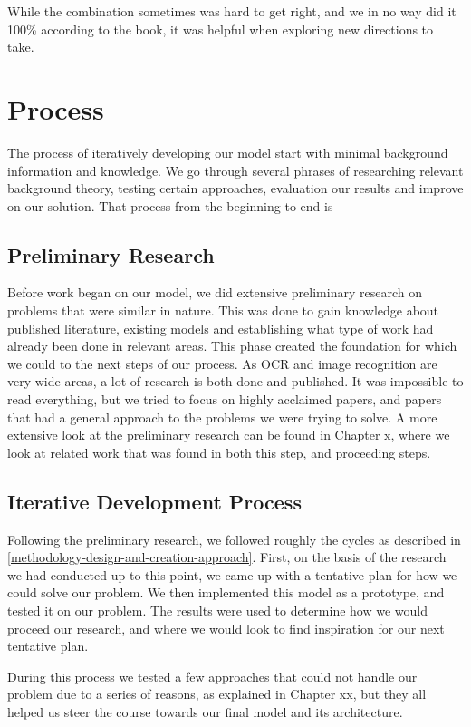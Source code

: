 While the combination sometimes was hard to get right, and we in no way did it 100\% according to the book, it was helpful when exploring new directions to take.


\section{Process}
The process of iteratively developing our model start with minimal background information and knowledge. We go through several phrases of researching relevant background theory, testing certain approaches, evaluation our results and improve on our solution. That process from the beginning to end is 

\subsection{Preliminary Research}
Before work began on our model, we did extensive preliminary research on problems that were similar in nature. This was done to gain knowledge about published literature, existing models and establishing what type of work had already been done in relevant areas. This phase created the foundation for which we could to the next steps of our process. As OCR and image recognition are very wide areas, a lot of research is both done and published. It was impossible to read everything, but we tried to focus on highly acclaimed papers, and papers that had a general approach to the problems we were trying to solve. A more extensive look at the preliminary research can be found in Chapter x, where we look at related work that was found in both this step, and proceeding steps.

\subsection{Iterative Development Process}
Following the preliminary research, we followed roughly the cycles as described in \ref{methodology-design-and-creation-approach}. First, on the basis of the research we had conducted up to this point, we came up with a tentative plan for how we could solve our problem. We then implemented this model as a prototype, and tested it on our problem. The results were used to determine how we would proceed our research, and where we would look to find inspiration for our next tentative plan.

During this process we tested a few approaches that could not handle our problem due to a series of reasons, as explained in Chapter xx, but they all helped us steer the course towards our final model and its architecture.

